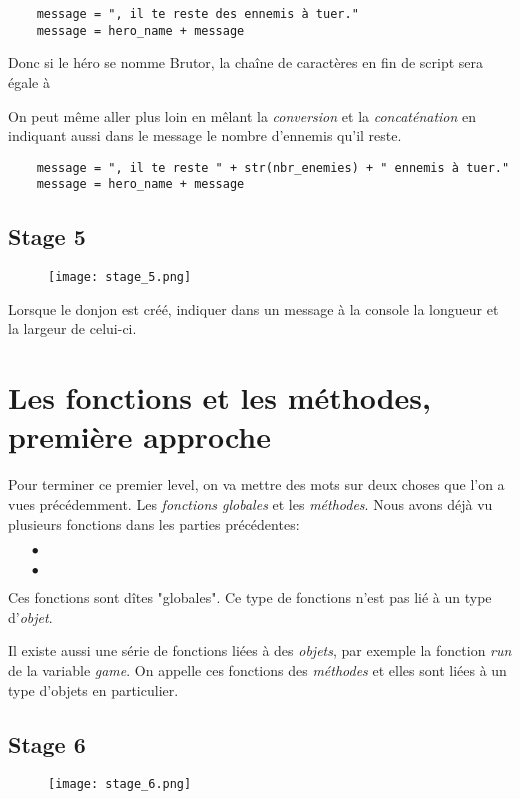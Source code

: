 \begin{lstlisting}
	message = ", il te reste des ennemis à tuer."
	message = hero_name + message
\end{lstlisting}

Donc si le héro se nomme Brutor, la chaîne de caractères en fin de script sera égale à 

On peut même aller plus loin en mêlant la \emph{conversion} et la \emph{concaténation} en indiquant aussi dans le message le nombre d'ennemis qu'il reste.

\begin{lstlisting}
	message = ", il te reste " + str(nbr_enemies) + " ennemis à tuer."
	message = hero_name + message
\end{lstlisting}

\subsection{Stage 5}
\begin{figure}[ht]
\texttt{[image: stage\_5.png]} 
\end{figure}

Lorsque le donjon est créé, indiquer dans un message à la console la longueur et la largeur de celui-ci.

\section{Les fonctions et les méthodes, première approche}

Pour terminer ce premier level, on va mettre des mots sur deux choses que l'on a vues précédemment. Les \emph{fonctions globales} et les \emph{méthodes}.
Nous avons déjà vu plusieurs fonctions dans les parties précédentes:
\begin{itemize}
	\item[$\bullet$] 
	\item[$\bullet$] 
\end{itemize}

Ces fonctions sont dîtes "globales". Ce type de fonctions n'est pas lié à un type d'\emph{objet}.

Il existe aussi une série de fonctions liées à des \emph{objets}, par exemple la fonction \emph{run} de la variable \emph{game}.
On appelle ces fonctions des \emph{méthodes} et elles sont liées à un type d'objets en particulier.

\subsection{Stage 6}
\begin{figure}[ht]
\texttt{[image: stage\_6.png]} 
\end{figure}

